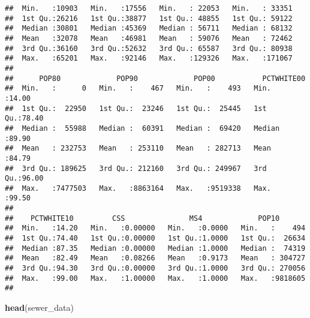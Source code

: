 \documentclass[]{article}
\newenvironment{Shaded}{\begin{snugshade}}{\end{snugshade}}
\newcommand{\KeywordTok}[1]{\textcolor[rgb]{0.13,0.29,0.53}{\textbf{#1}}}
\newcommand{\NormalTok}[1]{#1}
\begin{document}
\begin{verbatim}
##  Min.   :10903   Min.   :17556   Min.   : 22053   Min.   : 33351  
##  1st Qu.:26216   1st Qu.:38877   1st Qu.: 48855   1st Qu.: 59122  
##  Median :30801   Median :45369   Median : 56711   Median : 68132  
##  Mean   :32078   Mean   :46981   Mean   : 59076   Mean   : 72462  
##  3rd Qu.:36160   3rd Qu.:52632   3rd Qu.: 65587   3rd Qu.: 80938  
##  Max.   :65201   Max.   :92146   Max.   :129326   Max.   :171067  
##                                                                   
##      POP80             POP90             POP00           PCTWHITE00   
##  Min.   :      0   Min.   :    467   Min.   :    493   Min.   :14.00  
##  1st Qu.:  22950   1st Qu.:  23246   1st Qu.:  25445   1st Qu.:78.40  
##  Median :  55988   Median :  60391   Median :  69420   Median :89.90  
##  Mean   : 232753   Mean   : 253110   Mean   : 282713   Mean   :84.79  
##  3rd Qu.: 189625   3rd Qu.: 212160   3rd Qu.: 249967   3rd Qu.:96.00  
##  Max.   :7477503   Max.   :8863164   Max.   :9519338   Max.   :99.50  
##                                                                       
##    PCTWHITE10         CSS               MS4             POP10        
##  Min.   :14.20   Min.   :0.00000   Min.   :0.0000   Min.   :    494  
##  1st Qu.:74.40   1st Qu.:0.00000   1st Qu.:1.0000   1st Qu.:  26634  
##  Median :87.35   Median :0.00000   Median :1.0000   Median :  74319  
##  Mean   :82.49   Mean   :0.08266   Mean   :0.9173   Mean   : 304727  
##  3rd Qu.:94.30   3rd Qu.:0.00000   3rd Qu.:1.0000   3rd Qu.: 270056  
##  Max.   :99.00   Max.   :1.00000   Max.   :1.0000   Max.   :9818605  
## 
\end{verbatim}

\begin{Shaded}
\begin{Highlighting}[]
\KeywordTok{head}\NormalTok{(sewer_data)}
\end{Highlighting}
\end{Shaded}
\end{document}
